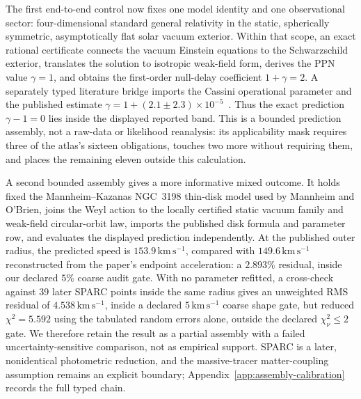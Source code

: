 \documentclass[11pt]{article}
\theoremstyle{definition}
\theoremstyle{remark}
\begin{document}
The first end-to-end control now fixes one model identity and one observational
sector: four-dimensional standard general relativity in the static,
spherically symmetric, asymptotically flat solar vacuum exterior.  Within that
scope, an exact rational certificate connects the vacuum Einstein equations to
the Schwarzschild exterior, translates the solution to isotropic weak-field
form, derives the PPN value $\gamma=1$, and obtains the first-order null-delay
coefficient $1+\gamma=2$.  A separately typed literature bridge imports the
Cassini operational parameter and the published estimate
$\gamma=1+(2.1\pm2.3)\times10^{-5}$~\cite{Bertotti2003}.  Thus the exact
prediction $\gamma-1=0$ lies inside the displayed reported band.  This is a
bounded prediction assembly, not a raw-data or likelihood reanalysis: its
applicability mask requires three of the atlas's sixteen obligations, touches
two more without requiring them, and places the remaining eleven outside this
calculation.

A second bounded assembly gives a more informative mixed outcome.  It holds
fixed the Mannheim--Kazanas NGC~3198 thin-disk model used by
Mannheim and O'Brien, joins the Weyl action to the locally certified static
vacuum family and weak-field circular-orbit law, imports the published disk
formula and parameter row, and evaluates the displayed prediction
independently.  At the published outer radius, the predicted speed is
$153.9\,\mathrm{km\,s^{-1}}$, compared with
$149.6\,\mathrm{km\,s^{-1}}$ reconstructed from the paper's endpoint
acceleration: a $2.893\%$ residual, inside our declared $5\%$ coarse audit
gate.  With no parameter refitted, a cross-check against 39 later SPARC points
inside the same radius gives an unweighted RMS residual of
$4.538\,\mathrm{km\,s^{-1}}$, inside a declared
$5\,\mathrm{km\,s^{-1}}$ coarse shape gate, but reduced
$\chi^2=5.592$ using the tabulated random errors alone, outside the declared
$\chi^2_\nu\leq2$ gate.  We therefore retain the result as a partial assembly
with a failed uncertainty-sensitive comparison, not as empirical support.
SPARC is a later, nonidentical photometric reduction, and the massive-tracer
matter-coupling assumption remains an explicit boundary; Appendix~\ref{app:assembly-calibration}
records the full typed chain.
\end{document}

